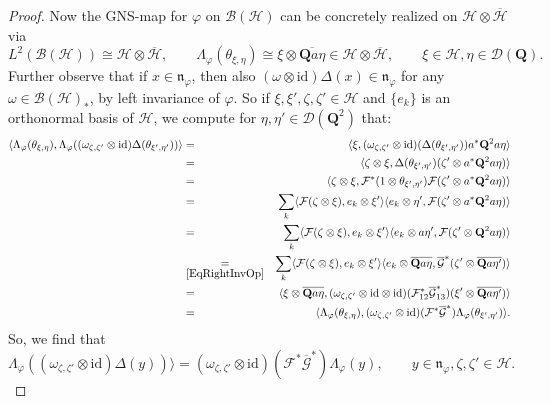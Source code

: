 \documentclass[11pt, reqno]{amsart}
\theoremstyle{definition}
\numberwithin{equation}{section}
\def\msD{\mathscr D}
\newcommand{\Hsp}{\mathcal{H}}
\newcommand{\Bc}{\mathcal{B}}
\newcommand{\Qb}{\mathbf{Q}}
\newcommand{\Fct}{\mathcal{F}}
\newcommand{\tFct}{\mathcal{G}}
\newcommand{\id}{\mathrm{id}}
\newcommand{\mfn}{\mathfrak{n}}
\begin{document}
\begin{proof}
Now the GNS-map for $\varphi$ on $\Bc(\Hsp)$ can be concretely realized on $\Hsp \otimes \overline{\Hsp}$ via 
\begin{equation}
L^2(\Bc(\Hsp))\cong \Hsp \otimes \overline{\Hsp},\qquad \Lambda_{\varphi}(\theta_{\xi,\eta}) \cong \xi \otimes \overline{\Qb a\eta} \in \Hsp \otimes \overline{\Hsp},\qquad \xi\in \Hsp,\eta\in \msD(\Qb).
\end{equation}
Further observe that if $x\in \mfn_{\varphi}$, then also $(\omega\otimes \id)\Delta(x) \in \mfn_{\varphi}$ for any $\omega \in \Bc(\Hsp)_*$, by left invariance of $\varphi$. So if $\xi,\xi',\zeta,\zeta'\in \Hsp$ and $\{e_k\}$ is an orthonormal basis of $\Hsp$, we compute for $\eta,\eta' \in \msD(\Qb^2)$ that: 
\begin{eqnarray*}
\langle \Lambda_{\varphi}(\theta_{\xi,\eta}) , \Lambda_{\varphi}((\omega_{\zeta,\zeta'}\otimes \id)\Delta(\theta_{\xi',\eta'}))\rangle &=& \langle \xi,(\omega_{\zeta,\zeta'}\otimes \id)(\Delta(\theta_{\xi',\eta'}))a^*\Qb^2a\eta\rangle \\
&=& \langle \zeta\otimes \xi,\Delta(\theta_{\xi',\eta'})(\zeta'\otimes a^*\Qb^2a\eta)\rangle \\
&=& \langle \zeta\otimes \xi,\Fct^*(1\otimes \theta_{\xi',\eta'})\Fct(\zeta'\otimes a^*\Qb^2a\eta)\rangle\\
&=& \sum_k \langle \Fct(\zeta\otimes \xi),e_k\otimes \xi'\rangle \langle e_k\otimes \eta',\Fct(\zeta'\otimes a^*\Qb^2a \eta)\rangle \\
&=& \sum_k \langle \Fct(\zeta\otimes \xi),e_k\otimes \xi'\rangle \langle e_k\otimes a\eta',\Fct(\zeta'\otimes \Qb^2a \eta)\rangle\\
&\underset{\eqref{EqRightInvOp}}{=}& \sum_k \langle \Fct(\zeta\otimes \xi),e_k\otimes \xi'\rangle \langle e_k\otimes \overline{\Qb a\eta},\overline{\tFct}^{*}(\zeta'\otimes \overline{\Qb a \eta'})\rangle\\
&=& \langle \xi \otimes \overline{\Qb a\eta},(\omega_{\zeta,\zeta'}\otimes \id\otimes \id)(\Fct^*_{12} \overline{\tFct}^*_{13})(\xi'\otimes \overline{\Qb a \eta'})\rangle\\
&=& \langle \Lambda_{\varphi}(\theta_{\xi,\eta}),(\omega_{\zeta,\zeta'}\otimes \id)(\Fct^* \overline{\tFct}^*) \Lambda_{\varphi}(\theta_{\xi',\eta'})\rangle. 
\end{eqnarray*} 
So, we find that 
\begin{equation}\label{EqOnBH}
\Lambda_{\varphi}((\omega_{\zeta,\zeta'}\otimes \id)\Delta(y))\rangle =  (\omega_{\zeta,\zeta'}\otimes \id)(\Fct^* \overline{\tFct}^*) \Lambda_{\varphi}(y),\qquad y\in \mfn_{\varphi},\zeta,\zeta'\in \Hsp.
\end{equation}


\end{proof}
\end{document}
